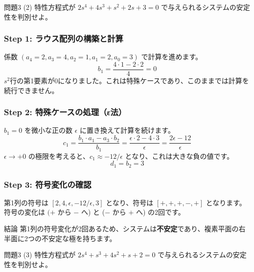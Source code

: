 \documentclass[11pt,a4paper]{ltjsarticle}
\begin{document}
\hrulefill
\vspace{1cm}

\begin{problem}{問題3 (2)}
    特性方程式が $2s^4+4s^3+s^2+2s+3=0$ で与えられるシステムの安定性を判別せよ。
\end{problem}

\begin{solution}
    \subsubsection*{Step 1: ラウス配列の構築と計算}
    係数 $(a_4=2, a_3=4, a_2=1, a_1=2, a_0=3)$ で計算を進めます。
    $$ b_1 = \frac{4 \cdot 1 - 2 \cdot 2}{4} = 0 $$
    $s^2$行の第1要素が0になりました。これは特殊ケースであり、このままでは計算を続行できません。

    \subsubsection*{Step 2: 特殊ケースの処理（ε法）}
    $b_1=0$ を微小な正の数 $\epsilon$ に置き換えて計算を続けます。
    $$ c_1 = \frac{b_1 \cdot a_1 - a_3 \cdot b_2}{b_1} = \frac{\epsilon \cdot 2 - 4 \cdot 3}{\epsilon} = \frac{2\epsilon - 12}{\epsilon} $$
    $\epsilon \to +0$ の極限を考えると、$c_1 \approx -12/\epsilon$ となり、これは大きな負の値です。
    $$ d_1 = b_2 = 3 $$
    
    \subsubsection*{Step 3: 符号変化の確認}
    第1列の符号は $[2, 4, \epsilon, -12/\epsilon, 3]$ となり、符号は $[+, +, +, -, +]$ となります。
    符号の変化は $(+$ から $-$ へ) と ($-$ から $+$ へ) の2回です。
\end{solution}

\begin{conclusion}{結論}
    第1列の符号変化が2回あるため、システムは\textbf{不安定}であり、複素平面の右半面に2つの不安定な極を持ちます。
\end{conclusion}

\clearpage

\begin{problem}{問題3 (3)}
    特性方程式が $2s^4+s^3+4s^2+s+2=0$ で与えられるシステムの安定性を判別せよ。
\end{problem}
\end{document}
